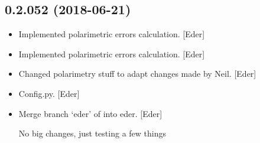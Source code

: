 \documentclass[a4paper,10pt,english]{report}
\begin{document}
\subsection{0.2.052 (2018-06-21)}
\label{\detokenize{misc/changelog:id412}}\begin{itemize}
\item {} 
Implemented polarimetric errors calculation. {[}Eder{]}

\item {} 
Implemented polarimetric errors calculation. {[}Eder{]}

\item {} 
Changed polarimetry stuff to adapt changes made by Neil. {[}Eder{]}

\item {} 
Config.py. {[}Eder{]}

\item {} 
Merge branch ‘eder’ of  into
eder. {[}Eder{]}

No big changes, just testing a few things

\end{itemize}
\end{document}
